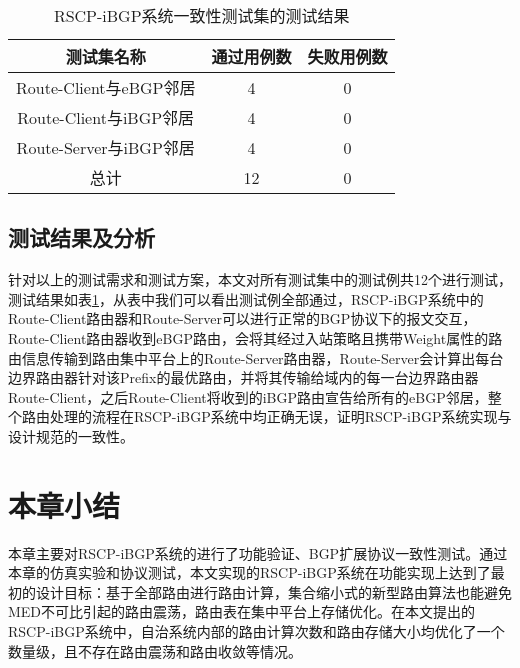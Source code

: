 \begin{table}[]
\centering
\caption{RSCP-iBGP系统一致性测试集的测试结果}
\label{tab:res}
\begin{tabular}{@{}ccc@{}}
\toprule
测试集名称               & 通过用例数 & 失败用例数 \\ \midrule
Route-Client与eBGP邻居 & 4     & 0     \\
Route-Client与iBGP邻居 & 4     & 0     \\
Route-Server与iBGP邻居 & 4     & 0     \\
总计                  & 12    & 0     \\ \bottomrule
\end{tabular}
\end{table}

\subsection{测试结果及分析}

针对以上的测试需求和测试方案，本文对所有测试集中的测试例共12个进行测试，测试结果如表\ref{tab:res}，从表中我们可以看出测试例全部通过，RSCP-iBGP系统中的Route-Client路由器和Route-Server可以进行正常的BGP协议下的报文交互，Route-Client路由器收到eBGP路由，会将其经过入站策略且携带Weight属性的路由信息传输到路由集中平台上的Route-Server路由器，Route-Server会计算出每台边界路由器针对该Prefix的最优路由，并将其传输给域内的每一台边界路由器Route-Client，之后Route-Client将收到的iBGP路由宣告给所有的eBGP邻居，整个路由处理的流程在RSCP-iBGP系统中均正确无误，证明RSCP-iBGP系统实现与设计规范的一致性。

\section{本章小结}

本章主要对RSCP-iBGP系统的进行了功能验证、BGP扩展协议一致性测试。通过本章的仿真实验和协议测试，本文实现的RSCP-iBGP系统在功能实现上达到了最初的设计目标：基于全部路由进行路由计算，集合缩小式的新型路由算法也能避免MED不可比引起的路由震荡，路由表在集中平台上存储优化。在本文提出的RSCP-iBGP系统中，自治系统内部的路由计算次数和路由存储大小均优化了一个数量级，且不存在路由震荡和路由收敛等情况。
